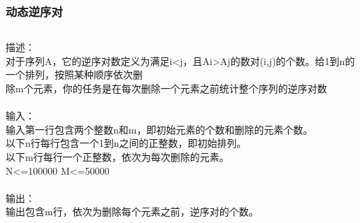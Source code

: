 \documentclass[twoside]{article}
\begin{document}
\subsubsection{动态逆序对}
\begin{lstlisting}
\end{lstlisting}
描述：\\
对于序列A，它的逆序对数定义为满足i<j，且Ai>Aj的数对(i,j)的个数。给1到n的一个排列，按照某种顺序依次删\\
除m个元素，你的任务是在每次删除一个元素之前统计整个序列的逆序对数\\
\\
输入：\\
输入第一行包含两个整数n和m，即初始元素的个数和删除的元素个数。\\
以下n行每行包含一个1到n之间的正整数，即初始排列。\\
以下m行每行一个正整数，依次为每次删除的元素。\\
N<=100000 M<=50000\\
\\
输出：\\
输出包含m行，依次为删除每个元素之前，逆序对的个数。\\
\end{document}
